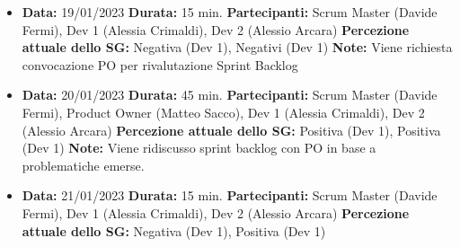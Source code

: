 \documentclass{article}
\begin{document}
    \begin{itemize}
        \item \textbf{Data:} 19/01/2023
        \newline \textbf{Durata:} 15 min.
        \newline \textbf{Partecipanti:} Scrum Master (Davide Fermi), Dev 1 (Alessia Crimaldi), Dev 2 (Alessio Arcara)
        \newline \textbf{Percezione attuale dello SG:} Negativa (Dev 1), Negativi (Dev 1)
        \newline \textbf{Note:} Viene richiesta convocazione PO per rivalutazione Sprint Backlog
    \end{itemize}
    \begin{itemize}
        \item \textbf{Data:} 20/01/2023
        \newline \textbf{Durata:} 45 min.
        \newline \textbf{Partecipanti:} Scrum Master (Davide Fermi), Product Owner (Matteo Sacco), Dev 1 (Alessia Crimaldi), Dev 2 (Alessio Arcara)
        \newline \textbf{Percezione attuale dello SG:} Positiva (Dev 1), Positiva (Dev 1)
        \newline \textbf{Note:} Viene ridiscusso sprint backlog con PO in base a problematiche emerse.
    \end{itemize}
    \begin{itemize}
        \item \textbf{Data:} 21/01/2023
        \newline \textbf{Durata:} 15 min.
        \newline \textbf{Partecipanti:} Scrum Master (Davide Fermi), Dev 1 (Alessia Crimaldi), Dev 2 (Alessio Arcara)
        \newline \textbf{Percezione attuale dello SG:} Negativa (Dev 1), Positiva (Dev 1)
    \end{itemize}
\end{document}
